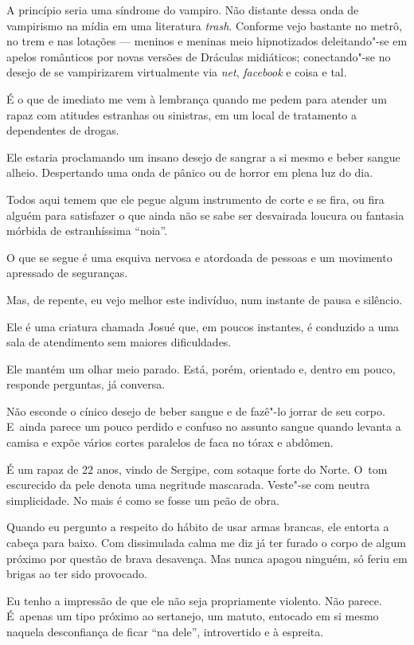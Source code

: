  

A princípio seria uma síndrome do vampiro. Não distante dessa onda de
vampirismo na mídia em uma literatura \emph{trash}. Conforme vejo
bastante no metrô, no trem e nas lotações --- meninos e meninas meio
hipnotizados deleitando"-se em apelos românticos por novas versões de
Dráculas midiáticos; conectando"-se no desejo de se vampirizarem
virtualmente via \emph{net}, \emph{facebook} e coisa e tal.

É o que de imediato me vem à lembrança quando me pedem para atender um
rapaz com atitudes estranhas ou sinistras, em um local de tratamento a
dependentes de drogas.

Ele estaria proclamando um insano desejo de sangrar a si mesmo e beber
sangue alheio. Despertando uma onda de pânico ou de horror em plena luz
do dia.

Todos aqui temem que ele pegue algum instrumento de corte e se fira, ou
fira alguém para satisfazer o que ainda não se sabe ser desvairada
loucura ou fantasia mórbida de estranhíssima ``noia''.

O que se segue é uma esquiva nervosa e atordoada de pessoas e um
movimento apressado de seguranças.

Mas, de repente, eu vejo melhor este indivíduo, num instante de pausa e
silêncio.

Ele é uma criatura chamada Josué que, em poucos instantes, é conduzido
a uma sala de atendimento sem maiores dificuldades.

Ele mantém um olhar meio parado. Está, porém, orientado e, dentro em
pouco, responde perguntas, já conversa.

Não esconde o cínico desejo de beber sangue e de fazê"-lo jorrar de seu
corpo. E~ainda parece um pouco perdido e confuso no assunto sangue
quando levanta a camisa e expõe vários cortes paralelos de faca no tórax
e abdômen.

É um rapaz de 22 anos, vindo de Sergipe, com sotaque forte do Norte. O~tom escurecido da pele denota uma negritude mascarada. Veste"-se com
neutra simplicidade. No mais é como se fosse um peão de obra.

Quando eu pergunto a respeito do hábito de usar armas brancas, ele
entorta a cabeça para baixo. Com dissimulada calma me diz já ter furado
o corpo de algum próximo por questão de brava desavença. Mas nunca
apagou ninguém, só feriu em brigas ao ter sido provocado.

Eu tenho a impressão de que ele não seja propriamente violento. Não
parece. É~apenas um tipo próximo ao sertanejo, um matuto, entocado em si
mesmo naquela desconfiança de ficar ``na dele'', introvertido e à
espreita.

